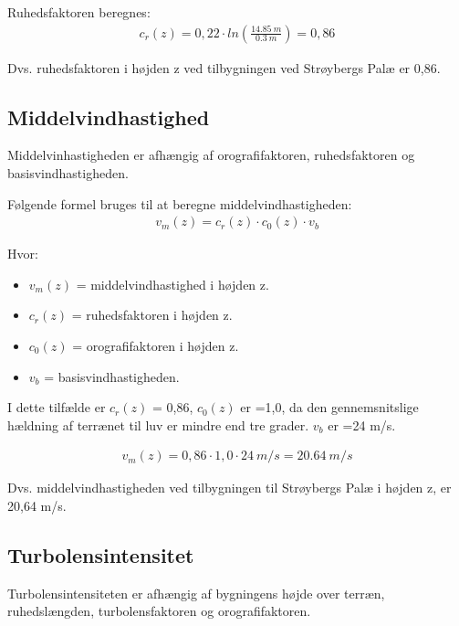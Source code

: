 Ruhedsfaktoren beregnes:
\begin{align*}
c_{r}(z) = 0,22 \cdot ln\left(\frac{\SI{14.85}{m}}{\SI{0,3}{m}}\right) = 0,86
\end{align*}

Dvs. ruhedsfaktoren i højden z ved tilbygningen ved Strøybergs Palæ er 0,86.







\subsection{Middelvindhastighed}
Middelvinhastigheden er afhængig af orografifaktoren, ruhedsfaktoren og basisvindhastigheden.

Følgende formel bruges til at beregne middelvindhastigheden:
\begin{align*}
v_{m}(z) =c_{r}(z) \cdot c_{0}(z) \cdot v_{b}
\end{align*}

Hvor:
\begin{itemize}
\item $ v_{m}(z) $ = middelvindhastighed i højden z.
\item $ c_{r}(z) $ = ruhedsfaktoren i højden z.
\item $ c_{0}(z) $ = orografifaktoren i højden z.
\item $ v_{b} $ = basisvindhastigheden.
\end{itemize}

I dette tilfælde er $ c_{r}(z) $ = 0,86, $ c_{0}(z) $ er =1,0, da den gennemsnitslige hældning af terrænet til luv er mindre end tre grader. $ v_{b} $ er =24 m/s.

\begin{align*}
v_{m}(z) = 0,86 \cdot 1,0 \cdot \SI{24}{m/s} = \SI{20.64}{m/s}
\end{align*}

Dvs. middelvindhastigheden ved tilbygningen til Strøybergs Palæ i højden z, er 20,64 m/s.








\subsection{Turbolensintensitet}
Turbolensintensiteten er afhængig af bygningens højde over terræn, ruhedslængden, turbolensfaktoren og orografifaktoren.

